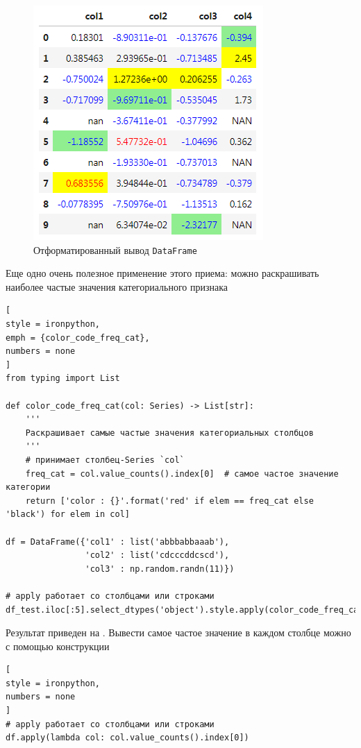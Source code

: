\documentclass[%
	11pt,
	a4paper,
	utf8,
		]{article}
\begin{document}
\begin{figure}[h]
	\centering
	\includegraphics[scale=1]{figures/format_df.png}
	\caption{ Отформатированный вывод \texttt{DataFrame} }\label{fig:format-df}
\end{figure}

Еще одно очень полезное применение этого приема: можно раскрашивать наиболее частые значения категориального признака

\begin{lstlisting}[
style = ironpython,
emph = {color_code_freq_cat},
numbers = none
]
from typing import List

def color_code_freq_cat(col: Series) -> List[str]:
    '''
    Раскрашивает самые частые значения категориальных столбцов
    '''
    # принимает столбец-Series `col`
    freq_cat = col.value_counts().index[0]  # самое частое значение категории
    return ['color : {}'.format('red' if elem == freq_cat else 'black') for elem in col]

df = DataFrame({'col1' : list('abbbabbaaab'),
                'col2' : list('cdcccddcscd'),
                'col3' : np.random.randn(11)})

# apply работает со столбцами или строками
df_test.iloc[:5].select_dtypes('object').style.apply(color_code_freq_cat)
\end{lstlisting}

Результат приведен на . Вывести самое частое значение в каждом столбце можно с помощью конструкции

\begin{lstlisting}[
style = ironpython,
numbers = none
]
# apply работает со столбцами или строками
df.apply(lambda col: col.value_counts().index[0])
\end{lstlisting}
\end{document}
